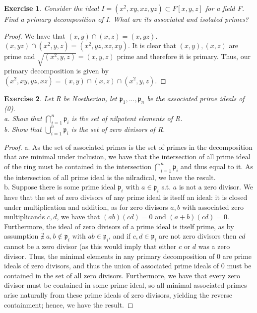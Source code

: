 \documentclass{article}
\newcommand{\fk}[1]{\mathfrak{#1}}
\newtheorem{exercise}{Exercise}
\begin{document}
\begin{exercise}
  Consider the ideal $I = (x^{2},xy,xz,yz) \subset F[x,y,z]$ for a field F. Find a primary decomposition of I. What are its associated and isolated primes?
\end{exercise}
\begin{proof}
We have that $(x,y) \cap (x,z) = (x, yz)$. $(x, yz) \cap (x^{2}, y, z)  = (x^{2}, yz, xz, xy)$. It is clear that $(x,y),(x,z)$ are prime and $\sqrt{(x^{2},y,z)} = (x,y,z)$ prime and therefore it is primary. Thus, our primary decomposition is given by $(x^{2},xy,yz,xz) = (x,y) \cap (x,z) \cap (x^{2},y,z)$. 
\end{proof}

\begin{exercise}
  Let R be Noetherian, let $\fk{p}_{1},...,\fk{p}_{n}$ be the associated prime ideals of (0). \\
  a. Show that $\bigcap_{i=1}^{n}\fk{p}_{i}$ is the set of nilpotent elements of R. \\
  b. Show that $\bigcup_{i=1}^{n}\fk{p}_{i}$ is the set of zero divisors of R.
\end{exercise}
\begin{proof}
  a. As the set of associated primes is the set of primes in the decomposition that are minimal under inclusion, we have that the intersection of all prime ideal of the ring must be contained in the intersection $\bigcap_{i=1}^{n}\fk{p}_{i}$ and thus equal to it. As the intersection of all prime ideal is the nilradical, we have the result. \\
  b. Suppose there is some prime ideal $\fk{p}_{i}$ with $a \in\fk{p}_{i}$ s.t. $a$ is not a zero divisor. We have that the set of zero divisors of any prime ideal is itself an ideal: it is closed under multiplication and addition, as for zero divisors $a,b$ with associated zero multiplicands $c,d$, we have that $(ab)(cd) = 0$ and $(a+b)(cd) = 0$. Furthermore, the ideal of zero divisors of a prime ideal is itself prime, as by assumption $\nexists \ a, b \notin \fk{p}_{i}$ with $ab \in \fk{p}_{i}$, and if $c,d \in \fk{p}_{i}$ are not zero divisors then $cd$ cannot be a zero divisor (as this would imply that either $c$ or $d$ was a zero divisor. Thus, the minimal elements in any primary decomposition of $0$ are prime ideals of zero divisors, and thus the union of associated prime ideals of $0$ must be contained in the set of all zero divisors. Furthermore, we have that every zero divisor must be contained in some prime ideal, so all minimal associated primes arise naturally from these prime ideals of zero divisors, yielding the reverse containment; hence, we have the result.
\end{proof}
\end{document}
